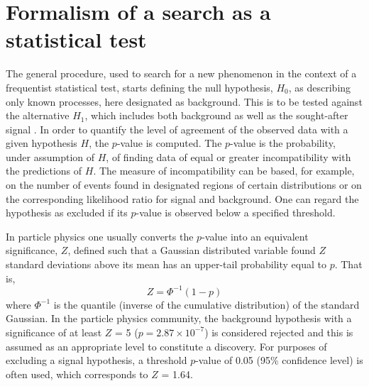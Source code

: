 \documentclass[a4paper, oneside, 11pt, openright]{book}
\begin{document}
		\section{Formalism of a search as a statistical test}
 			The general procedure, used to search for a new phenomenon in the context of a frequentist statistical test, starts defining the null hypothesis, $H_0$, as describing only known processes, here designated as background. This is to be tested against the alternative $H_1$, which includes both background as well as the sought-after signal \cite{Statistic}. In order to quantify the level of agreement of the observed data with a given hypothesis $H$, the $p$-value is computed. The $p$-value is the probability, under assumption of $H$, of finding data of equal or greater incompatibility with the predictions of $H$. The measure of incompatibility can be based, for example, on the number of events found in designated regions of certain distributions or on the corresponding likelihood ratio for signal and background. One can regard the hypothesis as excluded if its $p$-value is observed below a specified threshold.
 			
 			In particle physics one usually converts the $p$-value into an equivalent significance, $Z$, defined such that a Gaussian distributed variable found $Z$ standard deviations above its mean has an upper-tail probability equal to $p$. That is,
 			\begin{equation}\label{eq:Z}
 				Z = \Phi^{-1}(1-p)
 			\end{equation}
 			where $\Phi^{-1}$ is the quantile (inverse of the cumulative distribution) of the standard Gaussian. In the particle physics community, the background hypothesis with a significance of at least $Z$ = 5 ($p = 2.87\times10^{-7}$) is considered rejected and this is assumed as an appropriate level to constitute a discovery. For purposes of excluding a signal hypothesis, a threshold $p$-value of 0.05 (95\% confidence level) is often used, which corresponds to $Z$ = 1.64.
 			
\end{document}
